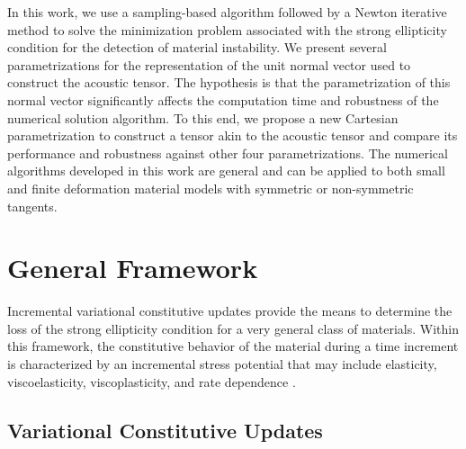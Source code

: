 \documentclass[12pt]{article}
\numberwithin{equation}{section}
\begin{document}
In this work, we use a sampling-based algorithm followed by a Newton
iterative method to solve the minimization problem associated with the
strong ellipticity condition for the detection of material
instability. We present several parametrizations for the
representation of the unit normal vector used to construct the
acoustic tensor. The hypothesis is that the parametrization of this
normal vector significantly affects the computation time and
robustness of the numerical solution algorithm. To this end, we
propose a new Cartesian parametrization to construct a tensor akin to
the acoustic tensor and compare its performance and robustness against
other four parametrizations. The numerical algorithms developed in
this work are general and can be applied to both small and finite
deformation material models with symmetric or non-symmetric tangents.

\section{General Framework}

Incremental variational constitutive updates provide the means to
determine the loss of the strong ellipticity condition for a very
general class of materials. Within this framework, the constitutive
behavior of the material during a time increment is characterized by
an incremental stress potential that may include elasticity,
viscoelasticity, viscoplasticity, and rate dependence
\citep{Ortiz.Stainier:1999, Lambrecht.etal:2003, Miehe.etal:2004,
  Weinberg.etal:2006, Fancello.etal:2006, Mosler.Bruhns:2010,
  Bleier.Mosler:2012}.

\subsection{Variational Constitutive Updates}
\end{document}
